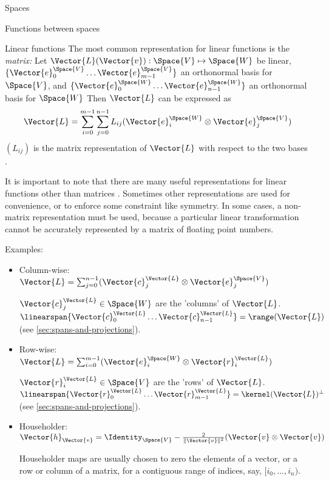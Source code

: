 \begin{plSection}{Spaces}
\begin{plSection}{Functions between spaces}
\begin{plSection}{Linear functions}
The most common representation for linear functions is the \textit{matrix:}
Let $\Vector{L}(\Vector{v}):\Space{V} \mapsto \Space{W}$ be linear,
$\{ \Vector{e}_0^{\Space{V}} \ldots  \Vector{e}_{m-1}^{\Space{V}} \}$ 
an orthonormal basis for $\Space{V}$,
and
$\{ \Vector{e}_0^{\Space{W}} \ldots \Vector{e}_{n-1}^{\Space{W}} \}$ 
an orthonormal  basis for $\Space{W}$
Then $\Vector{L}$ can be expressed as
\begin{equation}
\Vector{L}
 =
\sum_{i=0}^{m-1} \sum_{j=0}^{n-1} L_{ij}
 ( \Vector{e}_i^{\Space{W}} \otimes \Vector{e}_j^{\Space{V}} )
\end{equation}
$(L_{ij})$ is the matrix representation of $\Vector{L}$ with respect to
the two bases .

It is important to note that there are many useful
representations for linear functions other than 
matrices .
Sometimes other representations are used for convenience,
or to enforce some constraint like symmetry.
In some cases, a non-matrix representation must be used,
because a particular linear transformation
cannot be accurately represented by a matrix of floating point numbers.

Examples:

\begin{itemize}

\item Column-wise:
$\Vector{L} = \sum_{j=0}^{n-1} ( \Vector{c}_j^{\Vector{L}} \otimes \Vector{e}_j^{\Space{V}} )$

$\Vector{c}_j^{\Vector{L}} \in \Space{W}$ are the 'columns' of $\Vector{L}$.
$\linearspan\{ \Vector{c}_0^{\Vector{L}} \ldots \Vector{c}_{n-1}^{\Vector{L}} \} = \range(\Vector{L})$
(see \cref{sec:spans-and-projections}).

\item Row-wise:
$\Vector{L} = \sum_{i=0}^{m-1} ( \Vector{e}_i^{\Space{W}} \otimes  \Vector{r}_i^{\Vector{L}} )$

$\Vector{r}_i^{\Vector{L}} \in \Space{V}$ are the 'rows' of $\Vector{L}$.
$\linearspan\{ \Vector{r}_0^{\Vector{L}} \ldots \Vector{r}_{m-1}^{\Vector{L}} \} =  \kernel(\Vector{L})^{\perp}$
(see \cref{sec:spans-and-projections}).

\item Householder:
$\Vector{h}_{\Vector{v}} = \Identity_{\Space{V}} - \frac{2}{\| \Vector{v} \|^2} (\Vector{v} \otimes \Vector{v})$

Householder maps are usually chosen to zero the elements of
a vector, or a row or column of a matrix, for a contiguous range of
indices, say, $[i_0,\ldots,i_n)$.


\end{itemize}
\end{plSection}
\end{plSection}
\end{plSection}
